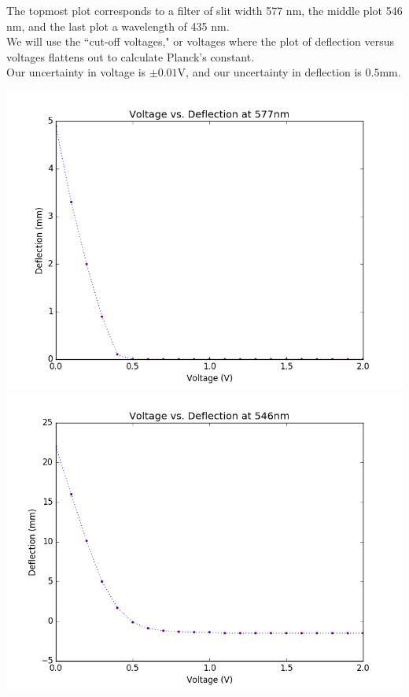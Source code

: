 \documentclass{amsart}
\begin{document}
\begin{table}[H]
\begin{minipage}{.42\textwidth}
\justify
The topmost plot corresponds to a filter of slit width 577 nm, the middle plot 546 nm, and the last plot a wavelength of 435 nm.\\
We will use the ``cut-off voltages," or voltages where the plot of deflection versus voltages flattens out to calculate Planck's constant.\\
Our uncertainty in voltage is $\pm0.01$V, and our uncertainty in deflection is $0.5$mm.



\end{minipage}
%
\begin{minipage}{.55\textwidth}
    \centering
    \includegraphics[height=.32\textheight]{577.png}\\
    \includegraphics[height=.32\textheight]{546.png}\\

\end{minipage}
\end{table}
\end{document}
